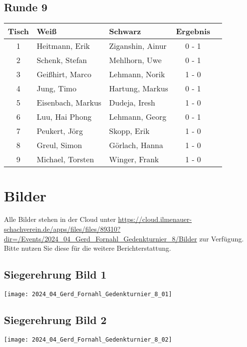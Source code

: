 \documentclass[a4paper,ngerman]{tui-algo-seminar}
\begin{document}
\subsection{Runde 9}
\begin{center}
\begin{tabular}{cllcl}
\toprule
\textbf{Tisch} & \textbf{Weiß} & \textbf{Schwarz} & \textbf{Ergebnis} \\
\midrule
1 & Heitmann, Erik & Ziganshin, Ainur & 0 - 1 \\
2 & Schenk, Stefan & Mehlhorn, Uwe & 0 - 1 \\
3 & Geißhirt, Marco & Lehmann, Norik & 1 - 0 \\
4 & Jung, Timo & Hartung, Markus & 0 - 1 \\
5 & Eisenbach, Markus & Dudeja, Iresh & 1 - 0 \\
6 & Luu, Hai Phong & Lehmann, Georg & 0 - 1 \\
7 & Peukert, Jörg & Skopp, Erik & 1 - 0 \\
8 & Greul, Simon & Görlach, Hanna & 1 - 0 \\
9 & Michael, Torsten & Winger, Frank & 1 - 0 \\
\bottomrule
\end{tabular}
\end{center}
\clearpage



\section{Bilder}
Alle Bilder stehen in der Cloud unter \url{https://cloud.ilmenauer-schachverein.de/apps/files/files/89310?dir=/Events/2024_04_Gerd_Fornahl_Gedenkturnier_8/Bilder} zur Verfügung. Bitte nutzen Sie diese für die weitere Berichterstattung.

\subsection{Siegerehrung Bild 1}
\begin{center}
    \texttt{[image: 2024\_04\_Gerd\_Fornahl\_Gedenkturnier\_8\_01]}
    \label{fig:gerd_fornahl_1}
\end{center}

\subsection{Siegerehrung Bild 2}
\begin{center}
    \texttt{[image: 2024\_04\_Gerd\_Fornahl\_Gedenkturnier\_8\_02]}
    \label{fig:gerd_fornahl_2}
\end{center}
\end{document}
